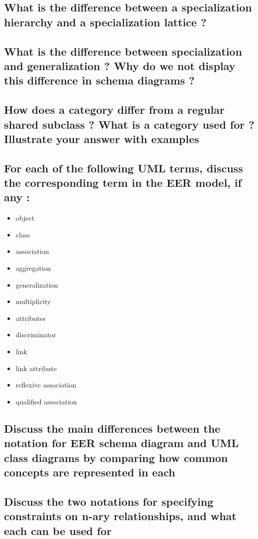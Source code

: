 \subsection{What is the difference between a specialization hierarchy and a specialization lattice ?}

\subsection{What is the difference between specialization and generalization ? Why do we not display this difference in schema diagrams ?}

\subsection{How does a category differ from a regular shared subclass ? What is a category used for ? Illustrate your answer with examples}

\subsection{For each of the following UML terms, discuss the corresponding term in the EER model, if any :}
\begin{itemize}
	\item object
	\item class
	\item association
	\item aggregation
	\item generalization
	\item multiplicity
	\item attributes
	\item discriminator
	\item link
	\item link attribute
	\item reflexive association
	\item qualified association
\end{itemize}

\subsection{Discuss the main differences between the notation for EER schema diagram and UML class diagrams by comparing how common concepts are represented in each}


\subsection{Discuss the two notations for specifying constraints on n-ary relationships, and what each can be used for}


